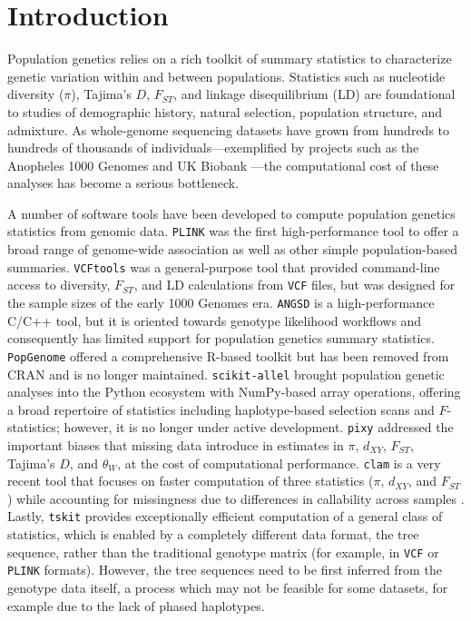 \documentclass[12pt]{article}
\newcommand{\citep}{\parencite}
\newcommand{\vcftools}{\texttt{VCFtools}\xspace}
\newcommand{\scikitallel}{\texttt{scikit-allel}\xspace}
\newcommand{\pixy}{\texttt{pixy}\xspace}
\newcommand{\clam}{\texttt{clam}\xspace}
\newcommand{\plink}{\texttt{PLINK}\xspace}
\newcommand{\angsd}{\texttt{ANGSD}\xspace}
\newcommand{\popgenome}{\texttt{PopGenome}\xspace}
\newcommand{\tskit}{\texttt{tskit}\xspace}
\newcommand{\vcf}{\texttt{VCF}\xspace}
\begin{document}
\section*{Introduction}

Population genetics relies on a rich toolkit of summary statistics to characterize
genetic variation within and between populations. Statistics such as nucleotide
diversity ($\pi$), Tajima's $D$, $F_{ST}$, and linkage disequilibrium (LD) are
foundational to studies of demographic history, natural selection, population
structure, and admixture. As whole-genome sequencing datasets have grown from
hundreds to hundreds of thousands of individuals---exemplified by projects such
as the Anopheles 1000 Genomes \citep{ag1000g2017} and UK Biobank
\citep{bycroft2018}---the computational cost of these analyses has become a
serious bottleneck.

A number of software tools have been developed to compute population genetics
statistics from genomic data. \plink \citep{purcell2007,chang2015} was the first 
high-performance tool to offer a broad range of genome-wide association as well as 
other simple population-based summaries. \vcftools \citep{danecek2011} was a
general-purpose tool that provided command-line access to diversity, $F_{ST}$,
and LD calculations from \vcf files, but was designed for the sample sizes of
the early 1000 Genomes era. \angsd \citep{korneliussen2014} is a
high-performance C/C++ tool, but it is oriented towards genotype likelihood 
workflows and consequently has limited support for population genetics summary 
statistics. \popgenome \citep{pfeifer2014} offered a
comprehensive R-based toolkit but has been removed from CRAN and is no longer
maintained. \scikitallel \citep{miles2024} brought population genetic analyses into 
the Python ecosystem with NumPy-based array operations, offering a broad repertoire of 
statistics including haplotype-based selection scans and $F$-statistics; however,
it is no longer under active development. \pixy \citep{korunes2021, bailey2025} 
addressed the important biases that missing data introduce in estimates in $\pi$, 
$d_{XY}$, $F_{ST}$, Tajima's $D$, and $\theta_W$, at the cost of computational 
performance. \clam is a very recent tool that focuses on faster computation of 
three statistics ($\pi$, $d_{XY}$, and $F_{ST}$) while accounting for missingness 
due to differences in callability across samples \citep{mirchandani2025}. Lastly,
\tskit \citep{jeffery2026} provides exceptionally efficient computation of a general 
class of statistics, which is enabled by a completely different data format, 
the tree sequence, rather than the traditional genotype matrix (for example, 
in \vcf or \plink formats). However, the tree sequences need to be first inferred 
from the genotype data itself, a process which may not be feasible for some datasets,
for example due to the lack of phased haplotypes.
\end{document}
